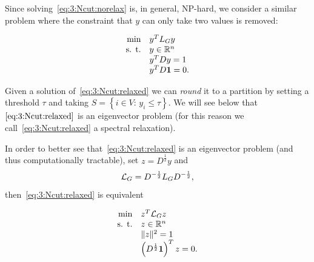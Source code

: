 Since solving~\eqref{eq:3:Ncut:norelax} is, in general, NP-hard, we consider a similar problem where the constraint that $y$ can only take two values is removed:

\begin{equation}\label{eq:3:Ncut:relaxed}
\begin{array}{rl}
\min & y^TL_Gy \\
\text{s. t.} & y\in \mathbb{R}^n \\
& y^TDy = 1 \\
 & y^TD\mathbf{1} = 0.
\end{array}
\end{equation}

Given a solution of~\eqref{eq:3:Ncut:relaxed} we can \emph{round} it to a partition by setting a threshold $\tau$ and taking $S = \left\{ i\in V:\, y_i \leq \tau  \right\}$. We will see below that $\eqref{eq:3:Ncut:relaxed}$ is an eigenvector problem (for this reason we call~\eqref{eq:3:Ncut:relaxed} a spectral relaxation).

In order to better see that~\eqref{eq:3:Ncut:relaxed} is an eigenvector problem (and thus computationally tractable), set $z = D^{\frac12}y$ and
\begin{equation}\label{eq:LLL_G}
\mathcal{L}_G = D^{-\frac12} L_G D^{-\frac12},
\end{equation}
then~\eqref{eq:3:Ncut:relaxed} is equivalent

\begin{equation}\label{eq:3:Ncut:relaxed_LLL}
\begin{array}{rl}
\min & z^T\mathcal{L}_Gz \\
\text{s. t.} & z\in \mathbb{R}^n \\
& \|z\|^2 = 1 \\
 & \left(D^{\frac12}\mathbf{1}\right)^Tz = 0.
\end{array}
\end{equation}


